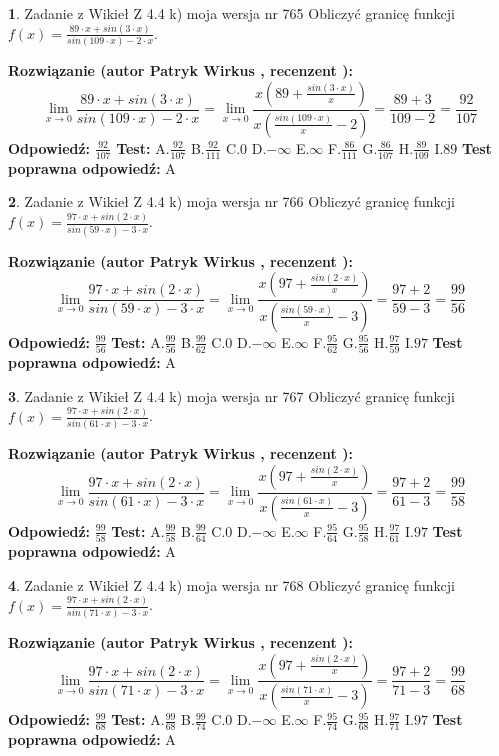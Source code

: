 \documentclass[12pt, a4paper]{article}
\theoremstyle{definition} %
\newtheorem{zad}{}
\newcommand{\zadStart}[1]{\begin{zad}#1\newline}
\newcommand{\zadStop}{\end{zad}}
\newcommand{\rozwStart}[2]{\noindent \textbf{Rozwiązanie (autor #1 , recenzent #2): }\newline}
\newcommand{\rozwStop}{\newline}
\newcommand{\odpStart}{\noindent \textbf{Odpowiedź:}\newline}
\newcommand{\odpStop}{\newline}
\newcommand{\testStart}{\noindent \textbf{Test:}\newline}
\newcommand{\testStop}{\newline}
\newcommand{\kluczStart}{\noindent \textbf{Test poprawna odpowiedź:}\newline}
\newcommand{\kluczStop}{\newline}
\begin{document}
\zadStart{Zadanie z Wikieł Z 4.4 k) moja wersja nr 765}
Obliczyć granicę funkcji $f(x)=\frac{89\cdot x +sin(3\cdot x)}{sin(109\cdot x) -2\cdot x}$.
\zadStop
\rozwStart{Patryk Wirkus}{}
$$\lim\limits_{x\to 0}\frac{89\cdot x +sin(3\cdot x)}{sin(109\cdot x) -2\cdot x}
=\lim\limits_{x\to 0}\frac{x(89+\frac{sin(3\cdot x)}{x})}{x(\frac{sin(109\cdot x)}{x}-2)}
=\frac{89+3}{109-2} = \frac{92}{107}$$
\rozwStop
\odpStart
$\frac{92}{107}$
\odpStop
\testStart
A.$\frac{92}{107}$
B.$\frac{92}{111}$
C.$0$
D.$-\infty$
E.$\infty$
F.$\frac{86}{111}$
G.$\frac{86}{107}$
H.$\frac{89}{109}$
I.$89$
\testStop
\kluczStart
A
\kluczStop



\zadStart{Zadanie z Wikieł Z 4.4 k) moja wersja nr 766}
Obliczyć granicę funkcji $f(x)=\frac{97\cdot x +sin(2\cdot x)}{sin(59\cdot x) -3\cdot x}$.
\zadStop
\rozwStart{Patryk Wirkus}{}
$$\lim\limits_{x\to 0}\frac{97\cdot x +sin(2\cdot x)}{sin(59\cdot x) -3\cdot x}
=\lim\limits_{x\to 0}\frac{x(97+\frac{sin(2\cdot x)}{x})}{x(\frac{sin(59\cdot x)}{x}-3)}
=\frac{97+2}{59-3} = \frac{99}{56}$$
\rozwStop
\odpStart
$\frac{99}{56}$
\odpStop
\testStart
A.$\frac{99}{56}$
B.$\frac{99}{62}$
C.$0$
D.$-\infty$
E.$\infty$
F.$\frac{95}{62}$
G.$\frac{95}{56}$
H.$\frac{97}{59}$
I.$97$
\testStop
\kluczStart
A
\kluczStop



\zadStart{Zadanie z Wikieł Z 4.4 k) moja wersja nr 767}
Obliczyć granicę funkcji $f(x)=\frac{97\cdot x +sin(2\cdot x)}{sin(61\cdot x) -3\cdot x}$.
\zadStop
\rozwStart{Patryk Wirkus}{}
$$\lim\limits_{x\to 0}\frac{97\cdot x +sin(2\cdot x)}{sin(61\cdot x) -3\cdot x}
=\lim\limits_{x\to 0}\frac{x(97+\frac{sin(2\cdot x)}{x})}{x(\frac{sin(61\cdot x)}{x}-3)}
=\frac{97+2}{61-3} = \frac{99}{58}$$
\rozwStop
\odpStart
$\frac{99}{58}$
\odpStop
\testStart
A.$\frac{99}{58}$
B.$\frac{99}{64}$
C.$0$
D.$-\infty$
E.$\infty$
F.$\frac{95}{64}$
G.$\frac{95}{58}$
H.$\frac{97}{61}$
I.$97$
\testStop
\kluczStart
A
\kluczStop



\zadStart{Zadanie z Wikieł Z 4.4 k) moja wersja nr 768}
Obliczyć granicę funkcji $f(x)=\frac{97\cdot x +sin(2\cdot x)}{sin(71\cdot x) -3\cdot x}$.
\zadStop
\rozwStart{Patryk Wirkus}{}
$$\lim\limits_{x\to 0}\frac{97\cdot x +sin(2\cdot x)}{sin(71\cdot x) -3\cdot x}
=\lim\limits_{x\to 0}\frac{x(97+\frac{sin(2\cdot x)}{x})}{x(\frac{sin(71\cdot x)}{x}-3)}
=\frac{97+2}{71-3} = \frac{99}{68}$$
\rozwStop
\odpStart
$\frac{99}{68}$
\odpStop
\testStart
A.$\frac{99}{68}$
B.$\frac{99}{74}$
C.$0$
D.$-\infty$
E.$\infty$
F.$\frac{95}{74}$
G.$\frac{95}{68}$
H.$\frac{97}{71}$
I.$97$
\testStop
\kluczStart
A
\kluczStop
\end{document}
